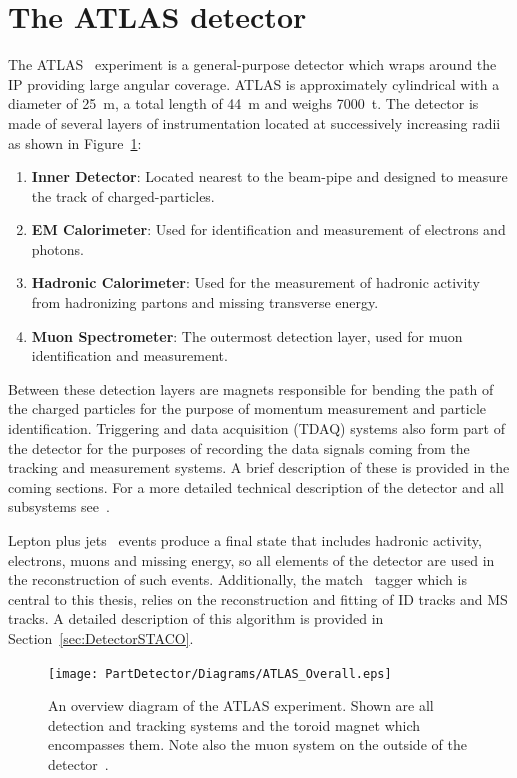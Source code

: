 \section{The ATLAS detector} \label{sec:the_atlas_detector}

The ATLAS~\cite{Detector:ATLASExperimentGeneral} experiment is a general-purpose detector which wraps around the IP providing large angular coverage. ATLAS is approximately cylindrical with a diameter of \SI{25}{\meter}, a total length of \SI{44}{\meter} and weighs \SI{7000}{\tonne}. The detector is made of several layers of instrumentation located at successively increasing radii as shown in Figure~\ref{fig:ATLASOverviewFigure}:

\begin{enumerate}
  \item \textbf{Inner Detector}: Located nearest to the beam-pipe and designed to measure the track of charged-particles.
  \item \textbf{EM Calorimeter}: Used for identification and measurement of electrons and photons.
  \item \textbf{Hadronic Calorimeter}: Used for the measurement of hadronic activity from hadronizing partons and missing transverse energy.
  \item \textbf{Muon Spectrometer}: The outermost detection layer, used for muon identification and measurement.
\end{enumerate}

Between these detection layers are magnets responsible for bending the path of the charged particles for the purpose of momentum measurement and particle identification. Triggering and data acquisition (TDAQ) systems also form part of the detector for the purposes of recording the data signals coming from the tracking and measurement systems. A brief description of these is provided in the coming sections. For a more detailed technical description of the detector and all subsystems see~\cite{Detector:ATLASExperimentGeneral}.

Lepton plus jets \ttbar\ events produce a final state that includes hadronic activity, electrons, muons and missing energy, so all elements of the detector are used in the reconstruction of such events. Additionally, the match \xsm\ tagger which is central to this thesis, relies on the reconstruction and fitting of ID tracks and MS tracks. A detailed description of this algorithm is provided in Section~\ref{sec:DetectorSTACO}.

\begin{figure}[htbp]
  \centering
    \texttt{[image: PartDetector/Diagrams/ATLAS\_Overall.eps]}
    \caption{An overview diagram of the ATLAS experiment. Shown are all detection and tracking systems and the toroid magnet which encompasses them. Note also the muon system on the outside of the detector~\cite{Detector:ATLASExperimentGeneral}.}
  \label{fig:ATLASOverviewFigure}
\end{figure}

